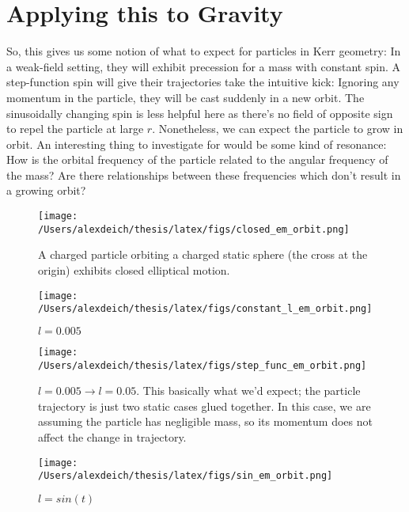 \documentclass[11pt]{article}
\begin{document}
\section{Applying this to Gravity}
So, this gives us some notion of what to expect for particles in Kerr geometry:  In a weak-field setting, they will exhibit precession for a mass with constant spin.  A step-function spin will give their trajectories take the intuitive kick:  Ignoring any momentum in the particle, they will be cast suddenly in a new orbit.  The sinusoidally changing spin is less helpful here as there's no field of opposite sign to repel the particle at large $r$.  Nonetheless, we can expect the particle to grow in orbit.  An interesting thing to investigate for would be some kind of resonance:  How is the orbital frequency of the particle related to the angular frequency of the mass?  Are there relationships between these frequencies which don't result in a growing orbit?
\newpage
\begin{figure}[h]
  \begin{center}
    \texttt{[image: /Users/alexdeich/thesis/latex/figs/closed\_em\_orbit.png]}
  \end{center}
  \caption{A charged particle orbiting a charged static sphere (the cross at the origin) exhibits closed elliptical motion.}
  \label{fig:closed_em_orbit}
\end{figure}

\begin{figure}[h]
  \begin{center}
    \texttt{[image: /Users/alexdeich/thesis/latex/figs/constant\_l\_em\_orbit.png]}
  \end{center}
  \caption{$l = 0.005$}
  \label{fig:constant_l_em_orbit}
\end{figure}

\begin{figure}[h]
  \begin{center}
    \texttt{[image: /Users/alexdeich/thesis/latex/figs/step\_func\_em\_orbit.png]}
  \end{center}
  \caption{$l = 0.005 \rightarrow l=0.05$.  This basically what we'd expect; the particle trajectory is just two static cases glued together.  In this case, we are assuming the particle has negligible mass, so its momentum does not affect the change in trajectory.}
  \label{fig:step_func_em_orbit}
\end{figure}

\begin{figure}[h]
  \begin{center}
    \texttt{[image: /Users/alexdeich/thesis/latex/figs/sin\_em\_orbit.png]}
  \end{center}
  \caption{$l = sin(t)$}
  \label{fig:sin_em_orbit}
\end{figure}
\end{document}
